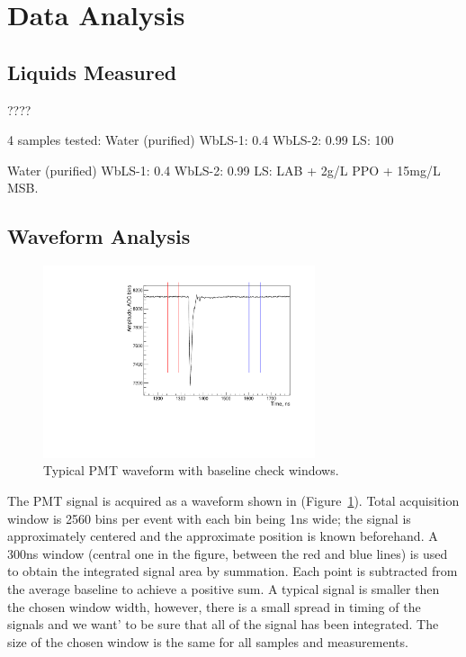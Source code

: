 \documentclass[preprint,12pt]{elsarticle}
\begin{document}
 \section{Data Analysis}
\label{data analysis}
\subsection{Liquids Measured}
????

4 samples tested:
 Water (purified)
 WbLS-1: 0.4%
 WbLS-2: 0.99%
 LS: 100%

Water (purified)
 WbLS-1: 0.4%
 WbLS-2: 0.99%
 LS: LAB + 2g/L PPO + 15mg/L MSB.



\subsection{Waveform Analysis}
\label{waveformanalysis}


\begin{figure}[ht]
\centering
\includegraphics[width=80mm]{PMTtypicalSignal.pdf}
\caption{Typical PMT waveform with baseline check windows.} \label{typicalpmtsignal}
\end{figure}

The PMT signal is acquired as a waveform shown in (Figure~\ref{typicalpmtsignal}). Total acquisition window is 2560 bins per event with each bin being 1ns wide; the signal is approximately centered and the approximate position is known beforehand. A 300ns window (central one in the figure, between the red and blue lines) is used to obtain the integrated signal area by summation. Each point is subtracted from the average baseline to achieve a positive sum. A typical signal is smaller then the chosen window width, however, there is a small spread in timing of the signals and we want' to be sure that all of the signal has been integrated. The size of the chosen window is the same for all samples and measurements.
\end{document}
